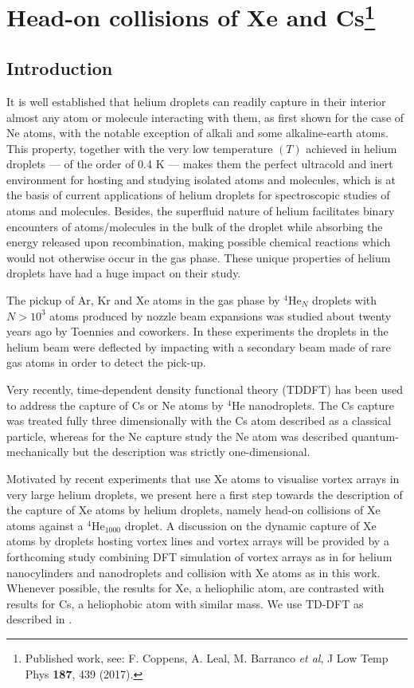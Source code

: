 \chapter{Head-on collisions of Xe and Cs\footnote{Published work, see: F. Coppens, A. Leal, M. Barranco \emph{et al}, J Low Temp Phys \textbf{187}, 439 (2017).}}\label{ch:head-on-xece}
	\section{Introduction}\label{sec:intro-collisions}
		It is well established that helium droplets can readily capture in their interior almost any atom or molecule interacting with them, as first shown for the case of Ne atoms\citep{Sch90}, with the notable exception of alkali\citep{Sti96} and some alkaline-earth\citep{Her07} atoms. This property, together with the very low temperature $(T)$ achieved in helium droplets --- of the order of 0.4 K --- makes them the perfect ultracold and inert environment for hosting and studying isolated atoms and molecules, which is at the basis of current applications of helium droplets for spectroscopic studies of atoms and molecules. Besides, the superfluid nature of helium facilitates binary encounters of atoms/molecules in the bulk of the droplet while absorbing the energy released upon recombination, making possible chemical reactions which would not otherwise occur in the gas phase. These unique properties  of helium droplets have had a huge impact on their study\citep{Toe04,Sti06,Tig07,Cal11a,Mud14}.

		The pickup of Ar, Kr and Xe atoms in the gas phase by $^4$He$_N$ droplets with $N> 10^3$ atoms produced by nozzle beam expansions was studied about twenty years ago by Toennies and coworkers\citep{Lew95}. In these experiments the droplets in the helium beam were deflected by impacting with a secondary beam made of rare gas atoms in order to detect the pick-up. 

		Very recently, time-dependent density functional theory (TDDFT) has been used to address the capture of Cs or Ne atoms by $^4$He nanodroplets\citep{Lea14a,Vil16b}. The Cs capture was treated fully three dimensionally with the Cs atom described as a classical particle, whereas for the Ne capture study the Ne atom was described quantum-mechanically but the description was strictly one-dimensional.
			
		Motivated by recent experiments that use Xe atoms to visualise vortex arrays in very large helium droplets\citep{Gom14,Jon16}, we present here a first step towards the description of the capture  of Xe atoms by helium droplets, namely head-on collisions of Xe atoms against a $^4$He$_{1000}$ droplet. A discussion on the dynamic capture of Xe atoms by droplets hosting vortex lines and vortex arrays will be provided by a forthcoming study combining DFT simulation of vortex arrays as in for helium nanocylinders and nanodroplets  and collision with Xe atoms as in this work. Whenever possible, the results for Xe, a heliophilic atom,  are contrasted with results for Cs, a heliophobic atom with similar mass. We use TD-DFT as described in . 

